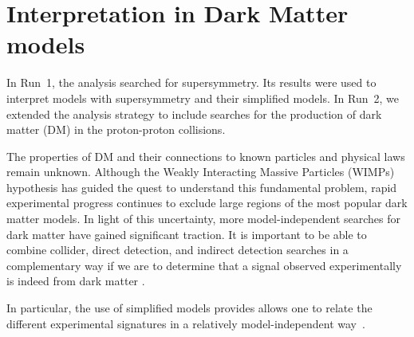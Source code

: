 \section{Interpretation in Dark Matter models}
\label{sec:darkmatter}

In Run~1, the \alphat analysis searched for supersymmetry. Its results were used to interpret models with supersymmetry and their simplified
models. In Run~2, we extended the analysis strategy to include searches for the production of dark matter (DM) in the proton-proton collisions.

The properties of DM and their connections to known particles and
physical laws remain unknown. Although the Weakly Interacting Massive
Particles (WIMPs) hypothesis has guided the quest to understand this
fundamental problem, rapid experimental progress continues to exclude
large regions of the most popular dark matter models. In light of this
uncertainty, more model-independent searches for dark matter have gained
significant traction. It is important to be able to combine collider,
direct detection, and indirect detection searches in a complementary way
if we are to determine that a signal observed experimentally is indeed
from dark matter \cite{Bauer:2013ihz}.

In particular, the use of simplified models provides allows one to relate the different experimental
signatures in a relatively model-independent way~\cite{Buchmueller:2014yoa}. 



